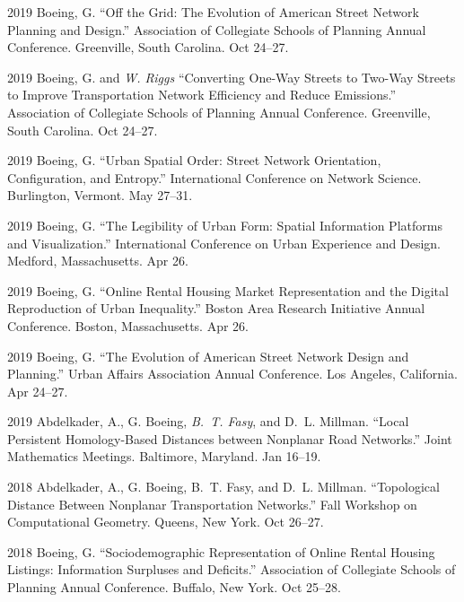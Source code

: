 \documentclass[12pt,letterpaper]{report}
\begin{document}
\begin{tablist}
        \item[2019] \tab Boeing, G. \enquote{Off the Grid: The Evolution of American Street Network Planning and Design.} Association of Collegiate Schools of Planning Annual Conference. Greenville, South Carolina. Oct 24--27.

        \item[2019] \tab Boeing, G. and \textit{W. Riggs} \enquote{Converting One-Way Streets to Two-Way Streets to Improve Transportation Network Efficiency and Reduce Emissions.} Association of Collegiate Schools of Planning Annual Conference. Greenville, South Carolina. Oct 24--27.

        \item[2019] \tab Boeing, G. \enquote{Urban Spatial Order: Street Network Orientation, Configuration, and Entropy.} International Conference on Network Science. Burlington, Vermont. May 27--31.

        \item[2019] \tab Boeing, G. \enquote{The Legibility of Urban Form: Spatial Information Platforms and Visualization.} International Conference on Urban Experience and Design. Medford, Massachusetts. Apr 26.

        \item[2019] \tab Boeing, G. \enquote{Online Rental Housing Market Representation and the Digital Reproduction of Urban Inequality.} Boston Area Research Initiative Annual Conference. Boston, Massachusetts. Apr 26.

        \item[2019] \tab Boeing, G. \enquote{The Evolution of American Street Network Design and Planning.} Urban Affairs Association Annual Conference. Los Angeles, California. Apr 24--27.

        \item[2019] \tab Abdelkader, A., G. Boeing, \textit{B.~T. Fasy}, and D.~L. Millman. \enquote{Local Persistent Homology-Based Distances between Nonplanar Road Networks.} Joint Mathematics Meetings. Baltimore, Maryland. Jan 16--19.

        \item[2018] \tab Abdelkader, A., G. Boeing, B.~T. Fasy, and D.~L. Millman. \enquote{Topological Distance Between Nonplanar Transportation Networks.} Fall Workshop on Computational Geometry. Queens, New York. Oct 26--27.

        \item[2018] \tab Boeing, G. \enquote{Sociodemographic Representation of Online Rental Housing Listings: Information Surpluses and Deficits.} Association of Collegiate Schools of Planning Annual Conference. Buffalo, New York. Oct 25--28.


\end{tablist}
\end{document}
